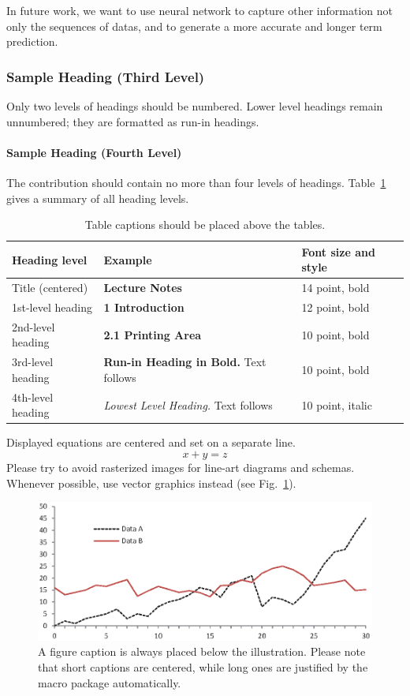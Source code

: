 \documentclass[runningheads]{llncs}
\begin{document}
In future work, we want to use neural network to capture other information not only the sequences of datas, and to generate a more accurate and longer term prediction.

\subsubsection{Sample Heading (Third Level)} Only two levels of
headings should be numbered. Lower level headings remain unnumbered;
they are formatted as run-in headings.

\paragraph{Sample Heading (Fourth Level)}
The contribution should contain no more than four levels of
headings. Table~\ref{tab1} gives a summary of all heading levels.

\begin{table}
\caption{Table captions should be placed above the
tables.}\label{tab1}
\begin{tabular}{|l|l|l|}
\hline
Heading level &  Example & Font size and style\\
\hline
Title (centered) &  {\Large\bfseries Lecture Notes} & 14 point, bold\\
1st-level heading &  {\large\bfseries 1 Introduction} & 12 point, bold\\
2nd-level heading & {\bfseries 2.1 Printing Area} & 10 point, bold\\
3rd-level heading & {\bfseries Run-in Heading in Bold.} Text follows & 10 point, bold\\
4th-level heading & {\itshape Lowest Level Heading.} Text follows & 10 point, italic\\
\hline
\end{tabular}
\end{table}


\noindent Displayed equations are centered and set on a separate
line.
\begin{equation}
x + y = z
\end{equation}
Please try to avoid rasterized images for line-art diagrams and
schemas. Whenever possible, use vector graphics instead (see
Fig.~\ref{fig1}).

\begin{figure}
\includegraphics[width=\textwidth]{fig1.eps}
\caption{A figure caption is always placed below the illustration.
Please note that short captions are centered, while long ones are
justified by the macro package automatically.} \label{fig1}
\end{figure}
\end{document}
